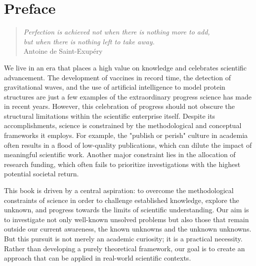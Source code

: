 %
%


\chapter*{Preface}

\begin{quote}
\begin{flushright}
\emph{Perfection is achieved not when there is nothing more to add, \\
but when there is nothing left to take away.}\\
Antoine de Saint-Exupéry\\
\end{flushright}
\end{quote}
\bigskip

%
%


We live in an era that places a high value on knowledge and celebrates scientific advancement. The development of vaccines in record time, the detection of gravitational waves, and the use of artificial intelligence to model protein structures are just a few examples of the extraordinary progress science has made in recent years. However, this celebration of progress should not obscure the structural limitations within the scientific enterprise itself. Despite its accomplishments, science is constrained by the methodological and conceptual frameworks it employs. For example, the "publish or perish" culture in academia often results in a flood of low-quality publications, which can dilute the impact of meaningful scientific work. Another major constraint lies in the allocation of research funding, which often fails to prioritize investigations with the highest potential societal return.

This book is driven by a central aspiration: to overcome the methodological constraints of science in order to challenge established knowledge, explore the unknown, and progress towards the limits of scientific understanding. Our aim is to investigate not only well-known unsolved problems but also those that remain outside our current awareness, the known unknowns and the unknown unknowns. But this pursuit is not merely an academic curiosity; it is a practical necessity. Rather than developing a purely theoretical framework, our goal is to create an approach that can be applied in real-world scientific contexts.

